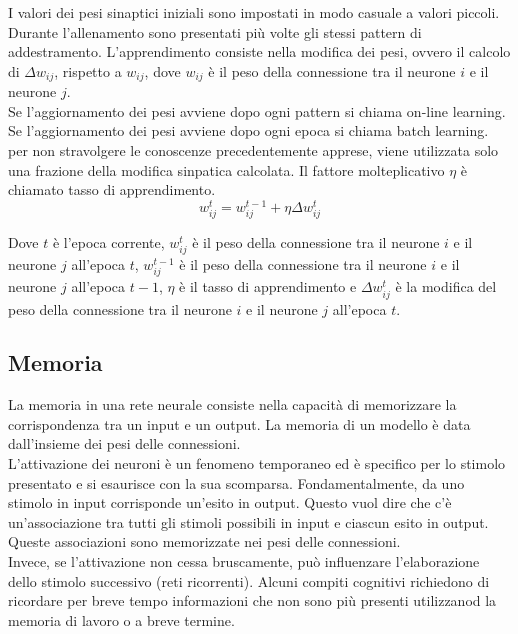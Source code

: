 I valori dei pesi sinaptici iniziali sono impostati in modo casuale a valori
piccoli. Durante l'allenamento sono presentati più volte gli stessi pattern di
addestramento. L'apprendimento consiste nella modifica dei pesi, ovvero il
calcolo di $\Delta w_{ij}$, rispetto a $w_{ij}$, dove $w_{ij}$ è il peso della
connessione tra il neurone $i$ e il neurone $j$.\\
Se l'aggiornamento dei pesi avviene dopo ogni pattern si chiama on-line
learning.  Se l'aggiornamento dei pesi avviene dopo ogni epoca si chiama batch
learning.\\
per non stravolgere le conoscenze precedentemente apprese, viene utilizzata solo
una frazione della modifica sinpatica calcolata. Il fattore molteplicativo
$\eta$ è chiamato tasso di apprendimento.
\begin{equation*}
	w^t_{ij} = w^{t-1}_{ij} + \eta \Delta w^t_{ij}
\end{equation*}

Dove $t$ è l'epoca corrente, $w^t_{ij}$ è il peso della connessione tra il
neurone $i$ e il neurone $j$ all'epoca $t$, $w^{t-1}_{ij}$ è il peso della
connessione tra il neurone $i$ e il neurone $j$ all'epoca $t-1$, $\eta$ è il
tasso di apprendimento e $\Delta w^t_{ij}$ è la modifica del peso della
connessione tra il neurone $i$ e il neurone $j$ all'epoca $t$.\\

\subsection{Memoria}

La memoria in una rete neurale consiste nella capacità di memorizzare la
corrispondenza tra un input e un output. La memoria di un modello è data
dall'insieme dei pesi delle connessioni.\\
L'attivazione dei neuroni è un fenomeno temporaneo ed è specifico per lo stimolo
presentato e si esaurisce con la sua scomparsa. Fondamentalmente, da uno stimolo in
input corrisponde un'esito in output. Questo vuol dire che c'è
un'associazione tra tutti gli stimoli possibili in input e ciascun esito in
output. Queste associazioni sono memorizzate nei pesi delle connessioni.\\
Invece, se l'attivazione non cessa bruscamente, può influenzare l'elaborazione
dello stimolo successivo (reti ricorrenti). Alcuni compiti cognitivi richiedono
di ricordare per breve tempo informazioni che non sono più presenti utilizzanod
la memoria di lavoro o a breve termine.


